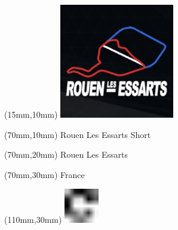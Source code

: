 \null\newpage
\begin{textblock*}{50mm}(15mm,10mm)%
\includegraphics[width=50mm]{LG/ROUE.png}
\end{textblock*}
\begin{textblock*}{130mm}(70mm,10mm)%
{\fontsize{20}{20}\selectfont Rouen Les Essarts Short}\\
\end{textblock*}
\begin{textblock*}{120mm}(70mm,20mm)%
{\fontsize{16}{16}\selectfont Rouen Les Essarts}\\
\end{textblock*}
\begin{textblock*}{120mm}(70mm,30mm)%
{\fontsize{12}{12}\selectfont France}
\end{textblock*}
\begin{textblock*}{30mm}(110mm,30mm)%
\centering
\includegraphics[height=15mm]{icons/fa-rotate-right.pdf}
\end{textblock*}
